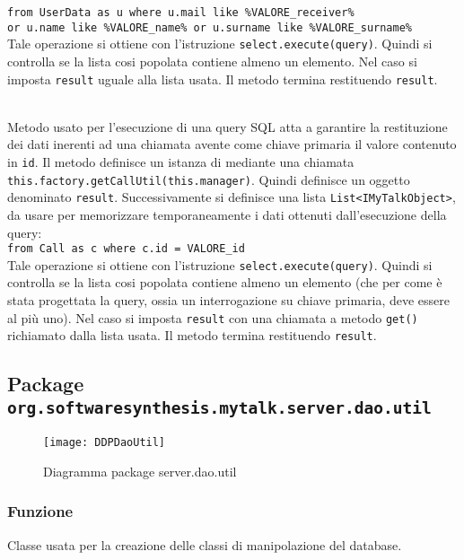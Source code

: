 \begin{description}
	\verb|from UserData as u where u.mail like %VALORE_receiver%|\\
	\verb|or u.name like %VALORE_name% or u.surname like %VALORE_surname%|\\
	
	Tale operazione si ottiene con l'istruzione \verb|select.execute(query)|. Quindi si controlla se la lista cosi popolata contiene almeno un elemento. Nel caso si imposta \texttt{result} uguale alla lista usata. Il metodo termina restituendo \texttt{result}.
	
		\item{}\\
	Metodo usato per l'esecuzione di una query SQL atta a garantire la restituzione dei dati inerenti ad una chiamata avente come chiave primaria il valore contenuto in \texttt{id}. Il metodo definisce un istanza di  mediante una chiamata \verb|this.factory.getCallUtil(this.manager)|. Quindi definisce un oggetto  denominato \texttt{result}. Successivamente si definisce una lista \texttt{List<IMyTalkObject>}, da usare per memorizzare temporaneamente i dati ottenuti dall'esecuzione della query:\\
	
	\verb|from Call as c where c.id = VALORE_id|\\
	
	Tale operazione si ottiene con l'istruzione \verb|select.execute(query)|. Quindi si controlla se la lista cosi popolata contiene almeno un elemento (che per come è stata progettata la query, ossia un interrogazione su chiave primaria, deve essere al più uno). Nel caso si imposta \texttt{result} con una chiamata a metodo \texttt{get()} richiamato dalla lista usata. Il metodo termina restituendo \texttt{result}.
	
\end{description}

\subsection{Package \texttt{org.softwaresynthesis.mytalk.server.dao.util}}\label{sec:daoUtil}

\begin{figure}[H]
  \texttt{[image: DDPDaoUtil]}
\caption{Diagramma package server.dao.util}
\end{figure}


\subsubsection*{Funzione}
Classe usata per la creazione delle classi di manipolazione del database.

